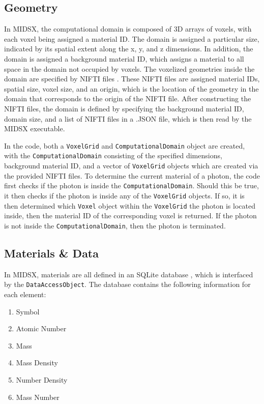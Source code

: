 \subsection{Geometry}
\par In MIDSX, the computational domain is composed of 3D arrays of voxels, with each voxel being assigned a material ID. The domain is assigned a particular size, indicated by its spatial extent along the x, y, and z dimensions. In addition, the domain is assigned a background material ID, which assigns a material to all space in the domain not occupied by voxels. The voxelized geometries inside the domain are specified by NIFTI files \cite{nifti2004}. These NIFTI files are assigned material IDs, spatial size, voxel size, and an origin, which is the location of the geometry in the domain that corresponds to the origin of the NIFTI file. After constructing the NIFTI files, the domain is defined by specifying the background material ID, domain size, and a list of NIFTI files in a .JSON file, which is then read by the MIDSX executable.
\par In the code, both a \texttt{VoxelGrid} and \texttt{ComputationalDomain} object are created, with the \texttt{ComputationalDomain} consisting of the specified dimensions, background material ID, and a vector of \texttt{VoxelGrid} objects which are created via the provided NIFTI files. To determine the current material of a photon, the code first checks if the photon is inside the \texttt{ComputationalDomain}. Should this be true, it then checks if the photon is inside any of the \texttt{VoxelGrid} objects. If so, it is then determined which \texttt{Voxel} object within the \texttt{VoxelGrid} the photon is located inside, then the material ID of the corresponding voxel is returned. If the photon is not inside the \texttt{ComputationalDomain}, then the photon is terminated.

\subsection{Materials \& Data}
\par In MIDSX, materials are all defined in an SQLite database \cite{sqlite2020hipp}, which is interfaced by the \texttt{DataAccessObject}. The database contains the following information for each element:

\begin{enumerate}
    \item Symbol
    \item Atomic Number
    \item Mass
    \item Mass Density
    \item Number Density
    \item Mass Number
\end{enumerate}

